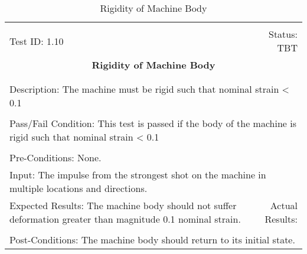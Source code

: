 \documentclass[titlepage]{article}
\begin{document}
\begin{center}%
\begin{table}
\begin{tabular}{|l r|}\hline&\\[-2mm]
	Test ID:   1.10	&Status: TBT\\[-3mm]
	\multicolumn{2}{|c|}{\textbf{\large{Rigidity of Machine Body}}}\\&\\\hline&\\[-3mm]
	\multicolumn{2}{|p{\textwidth}|}{Description: The machine must be rigid such that nominal strain < 0.1}\\[1mm]\hline&\\[-3mm]
	\multicolumn{2}{|p{\textwidth}|}{Pass/Fail Condition: This test is passed if the body of the machine is rigid such that nominal strain < 0.1}\\[1mm]\hline&\\[-3mm]
	\multicolumn{2}{|p{\textwidth}|}{Pre-Conditions: None.}\\[4mm]
	\multicolumn{2}{|p{\textwidth}|}{Input: The impulse from the strongest shot on the machine in multiple locations and directions.}\\[2mm]\hline
	\multicolumn{1}{|p{0.49\textwidth}}{Expected Results: The machine body should not suffer deformation greater than magnitude 0.1 nominal strain.}	&\multicolumn{1}{|p{0.45\textwidth}|}{Actual Results:}\\\hline&\\[-3mm]
	\multicolumn{2}{|p{\textwidth}|}{Post-Conditions: The machine body should return to its initial state.}\\\hline
\end{tabular}
\caption{Rigidity of Machine Body}
\end{table}
\end{center}
\end{document}

